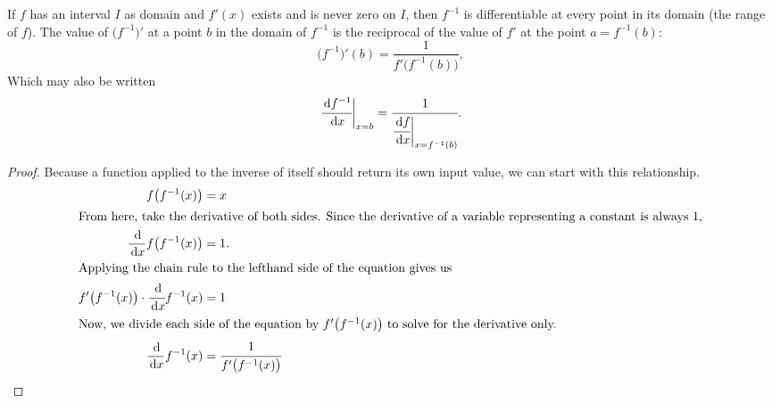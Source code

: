 \begin{theorem}\label{th:invderiv}
  If $f$ has an interval $I$ as domain and $f'(x)$ exists and is never zero on $I$, then $f^{-1}$ is differentiable at every point in its domain (the range of $f$). The value of $\big(f^{-1}\big)'$ at a point $b$ in the domain of $f^{-1}$ is the reciprocal of the value of $f'$ at the point $a=f^{-1}(b)$:
  \begin{equation}
    \big(f^{-1}\big)'(b)=\frac{1}{f'\big(f^{-1}(b)\big)},
  \end{equation}
  Which may also be written
  \begin{equation}
    \cfrac{\,\mathrm{d} f^{-1}}{\,\mathrm{d} x}\bigg|_{x=b}=\cfrac{1}{\cfrac{\,\mathrm{d} f}{\,\mathrm{d} x}\bigg|_{x=f^{-1}(b)}}.
  \end{equation}
  \begin{proof}
  Because a function applied to the inverse of itself should return its own input value, we can start with this relationship.
    \begin{align*}
      f \big( f^{-1}(x) \big) &= x \\
      \intertext{From here, take the derivative of both sides. Since the derivative of a variable representing a constant is always 1,}
      \frac{\,\mathrm{d}}{\,\mathrm{d} x} f\big(f^{-1}(x)\big) &= 1. \\
      \intertext{Applying the chain rule to the lefthand side of the equation gives us}
      f'\big(f^{-1}(x)\big)\cdot \cfrac{\,\mathrm{d}}{\,\mathrm{d} x}f^{-1}(x) &= 1  \\
      \intertext{Now, we divide each side of the equation by $f' \big( f^{-1}(x) \big)$ to solve for the derivative only.}
      \frac{\,\mathrm{d}}{\,\mathrm{d} x}f^{-1}(x) &= \cfrac{1}{f'\big(f^{-1}(x)\big)}\qedhere
    \end{align*}
  \end{proof}
\end{theorem}

